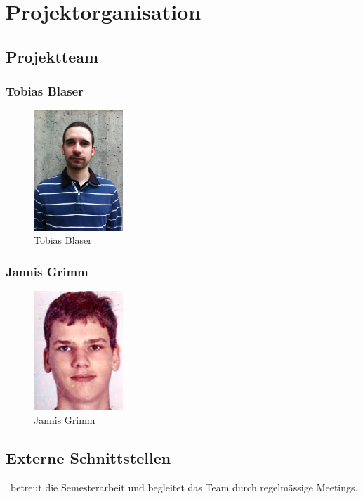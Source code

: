 \chapter{Projektorganisation}

\section{Projektteam}
\subsection*{Tobias Blaser}
\begin{figure}[H]
	\includegraphics[width=0.3\textwidth]{img/tobias.jpg}
	\centering
	\caption{Tobias Blaser}
	\label{fig:tobias}
\end{figure}

\subsection*{Jannis Grimm}
\begin{figure}[H]
	\includegraphics[width=0.3\textwidth]{img/jannis.jpg}
	\centering
	\caption{Jannis Grimm}
	\label{fig:jannis}
\end{figure}

\section{Externe Schnittstellen}
\teacher\ betreut die Semesterarbeit und begleitet das Team durch regelmässige Meetings.
